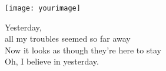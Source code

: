 \documentclass[12pt]{article}
\begin{document}
\noindent\begin{minipage}{0.5\textwidth}%
\texttt{[image: yourimage]}
\end{minipage}%
\hfill%
\begin{minipage}{0.5\textwidth}\raggedleft
Yesterday,\\
all my troubles seemed so far away\\
Now it looks as though they're here to stay\\
Oh, I believe in yesterday.
\end{minipage}
\end{document}
